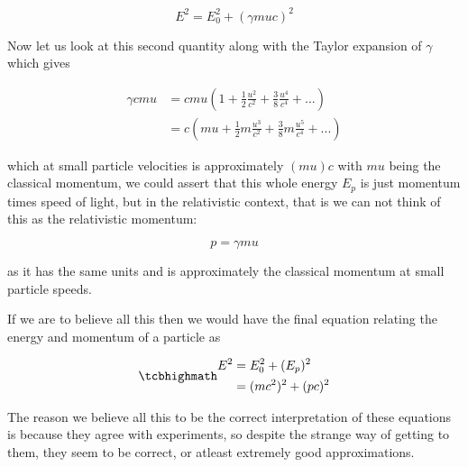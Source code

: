 \begin{equation}
	E^2 = E_0^2 + (\gamma{m}{u}{c})^2
\end{equation}

Now let us look at this second quantity along with the Taylor expansion of $\gamma$ which gives

\begin{equation}
	\begin{aligned}
		\gamma {c}{m}{u} & = {c}{m}{u} \left(1 + \frac{1}{2}\frac{u^2}{{c}^2} + \frac{3}{8}\frac{u^4}{c^4} + ...
		\right)                                                                                                       \\
		                     & ={c}\left( {m}{u} + \frac{1}{2}m \frac{u^3}{{c}^2} + \frac{3}{8}m\frac{u^5}{c^4} + ...
		\right)
	\end{aligned}
\end{equation}

which at small particle velocities is approximately $({m}{u}){c}$ with ${m}{u}$ being the classical momentum, we could assert that this whole energy $E_p$ is just momentum times speed of light, but in the relativistic context, that is we can not think of this as the relativistic momentum:

\begin{equation}
	p = \gamma {m}{u}
\end{equation}

as it has the same units and is approximately the classical momentum at small particle speeds.

If we are to believe all this then we would have the final equation relating the energy and momentum of a particle as

\begin{equation}
	\mhl{
		\begin{aligned}
		E^2 & = E_0^2 + (E_p)^2 \\
		    & = (mc^2)^2 + (pc)^2
		\end{aligned}
	}
\end{equation}

The reason we believe all this to be the correct interpretation of these equations is because they agree with experiments, so despite the strange way of getting to them, they seem to be correct, or atleast extremely good approximations.


